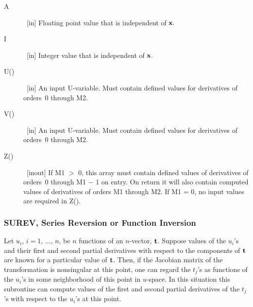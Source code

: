 \documentclass[twoside]{MATH77}
\begin{document}
\begin{description}
\item[A]  \ [in] Floating point value that is independent of ${\bf x}.$

\item[I]  \ [in] Integer value that is independent of ${\bf x}.$

\item[U()]  \ [in] An input U-variable. Must contain defined values for
derivatives of orders~0 through M2.

\item[V()]  \ [in] An input U-variable. Must contain defined values for
derivatives of orders~0 through M2.

\item[Z()]  \ [inout] If M1 $>$ 0, this array must contain defined values of
derivatives of orders~0 through M1 $-$ 1 on entry. On return it will also contain
computed values of derivatives of orders M1 through M2. If M1 = 0, no input
values are required in Z().
\end{description}

\subsubsection{SUREV, Series Reversion or Function Inversion}

Let $u_i$, $i = 1$, ..., $n$, be $n$ functions of an $n$-vector, ${\bf t}$.
Suppose values of the $u_i$'s and their first and second partial
derivatives with respect to the components of ${\bf t}$ are known for a particular
value of ${\bf t}$. Then, if the Jacobian matrix of the transformation is
nonsingular at this point, one can regard the $t_j$'s as functions
of the $u_i$'s in some neighborhood of this point in $u$-space. In
this situation this subroutine can compute values of the first and second
partial derivatives of the $t_j$'s with respect to the $%
u_i$'s at this point.
\end{document}
